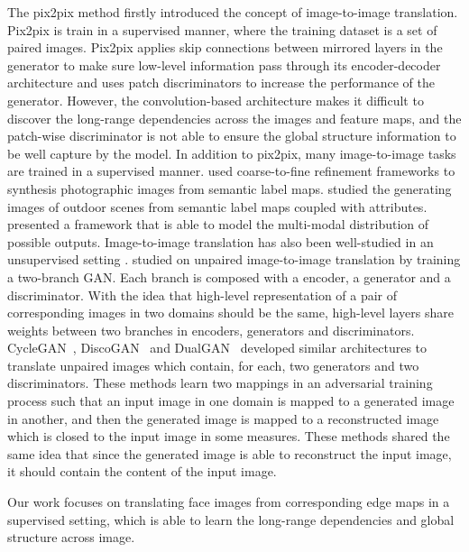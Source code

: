 The pix2pix method \cite{pix2pix} firstly introduced the concept of image-to-image translation. Pix2pix is train in a supervised manner, where the training dataset is a set of paired images. 
Pix2pix applies skip connections \cite{Unet} between mirrored layers in the generator to make sure low-level information pass through its encoder-decoder architecture and uses patch discriminators \cite{PatchDicriminator} to increase the performance of the generator. However, the convolution-based architecture makes it difficult to discover the long-range dependencies across the images and feature maps, and the patch-wise discriminator is not able to ensure the global structure information to be well capture by the model.
%
In addition to pix2pix, many image-to-image tasks \cite{See pix2pixHD} are trained in a supervised manner. 
\cite{CascadedGANs, pix2pixHD} used coarse-to-fine refinement frameworks to synthesis photographic images from semantic label maps. 
\cite{pix2pixHD-25} studied the generating images of outdoor scenes from semantic label maps coupled with attributes.
\cite{BicycleGANs} presented a framework that is able to model the multi-modal distribution of possible outputs.
%
%
Image-to-image translation has also been well-studied in an unsupervised setting \cite{See pix2pixHD}.
\cite{UNIT} studied on unpaired image-to-image translation by training a two-branch GAN. Each branch is composed with a encoder, a generator and a discriminator. With the idea that high-level representation of a pair of corresponding images in two domains should be the same, high-level layers share weights between two branches in encoders, generators and discriminators. 
%
CycleGAN~\cite{CycleGAN}, DiscoGAN~\cite{DiscoGAN} and DualGAN~\cite{DualGAN} developed similar architectures to translate unpaired images which contain, for each, two generators and two discriminators. These methods learn two mappings in an adversarial training process such that an input image in one domain is mapped to a generated image in another, and then the generated image is mapped to a reconstructed image which is closed to the input image in some measures. These methods shared the same idea that since the generated image is able to reconstruct the input image, it should contain the content of the input image. 

Our work focuses on translating face images from corresponding edge maps in a supervised setting, which is able to learn the long-range dependencies and global structure across image.


